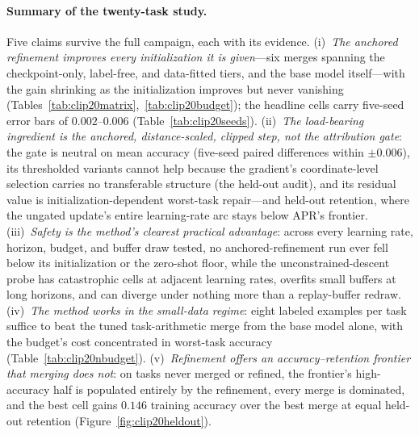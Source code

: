 \documentclass[11pt]{article}
\begin{document}
\paragraph{Summary of the twenty-task study.}
Five claims survive the full campaign, each with its evidence. (i)~\emph{The anchored refinement improves every initialization it is given}---six merges spanning the checkpoint-only, label-free, and data-fitted tiers, and the base model itself---with the gain shrinking as the initialization improves but never vanishing (Tables~\ref{tab:clip20matrix},~\ref{tab:clip20budget}); the headline cells carry five-seed error bars of $0.002$--$0.006$ (Table~\ref{tab:clip20seeds}). (ii)~\emph{The load-bearing ingredient is the anchored, distance-scaled, clipped step, not the attribution gate}: the gate is neutral on mean accuracy (five-seed paired differences within $\pm0.006$), its thresholded variants cannot help because the gradient's coordinate-level selection carries no transferable structure (the held-out audit), and its residual value is initialization-dependent worst-task repair---and held-out retention, where the ungated update's entire learning-rate arc stays below APR's frontier. (iii)~\emph{Safety is the method's clearest practical advantage}: across every learning rate, horizon, budget, and buffer draw tested, no anchored-refinement run ever fell below its initialization or the zero-shot floor, while the unconstrained-descent probe has catastrophic cells at adjacent learning rates, overfits small buffers at long horizons, and can diverge under nothing more than a replay-buffer redraw. (iv)~\emph{The method works in the small-data regime}: eight labeled examples per task suffice to beat the tuned task-arithmetic merge from the base model alone, with the budget's cost concentrated in worst-task accuracy (Table~\ref{tab:clip20nbudget}). (v)~\emph{Refinement offers an accuracy--retention frontier that merging does not}: on tasks never merged or refined, the frontier's high-accuracy half is populated entirely by the refinement, every merge is dominated, and the best cell gains $0.146$ training accuracy over the best merge at equal held-out retention (Figure~\ref{fig:clip20heldout}).
\end{document}
